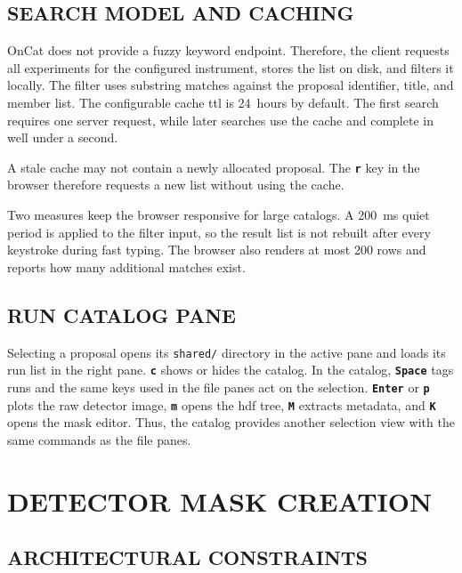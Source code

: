 \documentclass[tm]{ornltm}
\newcommand{\key}[1]{\textbf{\texttt{#1}}}
\begin{document}
\subsection{SEARCH MODEL AND CACHING}

OnCat does not provide a fuzzy keyword endpoint. Therefore, the client requests
all experiments for the configured instrument, stores the list on disk, and
filters it locally. The filter uses substring matches against the proposal
identifier, title, and member list. The configurable cache \ac{ttl} is 24~hours
by default. The first search requires one server request, while later searches
use the cache and complete in well under a second.

A stale cache may not contain a newly allocated proposal. The \key{r} key in the
browser therefore requests a new list without using the cache.

Two measures keep the browser responsive for large catalogs. A 200~ms quiet
period is applied to the filter input, so the result list is not rebuilt after
every keystroke during fast typing. The browser also renders at most 200 rows
and reports how many additional matches exist.

\subsection{RUN CATALOG PANE}

Selecting a proposal opens its \texttt{shared/} directory in the active pane and
loads its run list in the right pane. \key{c} shows or hides the catalog. In the
catalog, \key{Space} tags runs and the same keys used in the file panes act on
the selection. \key{Enter} or \key{p} plots the raw detector image, \key{m}
opens the \ac{hdf} tree, \key{M} extracts metadata, and \key{K} opens the mask
editor. Thus, the catalog provides another selection view with the same commands
as the file panes.

\section{DETECTOR MASK CREATION}
\label{sec:mask}

\subsection{ARCHITECTURAL CONSTRAINTS}
\end{document}
